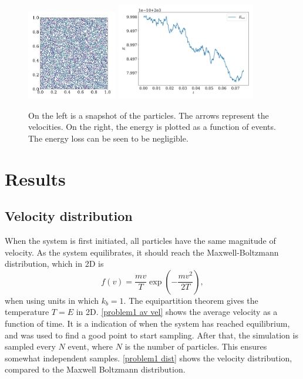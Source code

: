 \documentclass{article}
\begin{document}
    \begin{figure}[H]
        \centering
        \includegraphics[width=0.35\textwidth]{../plots/test_case_many_particles/test_case_many_particles.pdf}
        \includegraphics[width=0.54\textwidth]{../plots/test_case_many_particles/energy.pdf}
        \caption{On the left is a snapshot of the particles. The arrows represent the velocities. On the right, the energy is plotted as a function of events. The energy loss can be seen to be negligible.}
        \label{test many particles}
    \end{figure}

    \section*{Results}
    \subsection*{Velocity distribution}

    When the system is first initiated, all particles have the same magnitude of velocity. As the system equilibrates, it should reach the Maxwell-Boltzmann distribution, which in 2D is
    \begin{equation*}
        f(v) = \frac{m v}{T} \exp \left(-\frac{m v^2}{2 T}\right),
    \end{equation*}
    when using units in which $k_b = 1$. The equipartition theorem gives the temperature $T = E$ in 2D. \autoref{problem1 av vel} shows the average velocity as a function of time. It is a indication of when the system has reached equilibrium, and was used to find a good point to start sampling. After that, the simulation is sampled every $N$ event, where $N$ is the number of particles. This ensures somewhat independent samples. \autoref{problem1 dist} shows the velocity distribution, compared to the Maxwell Boltzmann distribution.
\end{document}
